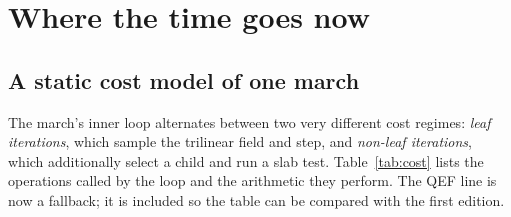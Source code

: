 \documentclass[11pt,a4paper]{article}
\theoremstyle{plain}
\theoremstyle{definition}
\theoremstyle{remark}
\begin{document}
\section{Where the time goes now}
\label{sec:bottlenecks}

\subsection{A static cost model of one march}

The march's inner loop alternates between two very different cost regimes:
\emph{leaf iterations}, which sample the trilinear field and step, and
\emph{non-leaf iterations}, which additionally select a child and run a slab
test. Table~\ref{tab:cost} lists the operations called by the loop and the
arithmetic they perform. The QEF line is now a fallback; it is included so the
table can be compared with the first edition.
\end{document}
